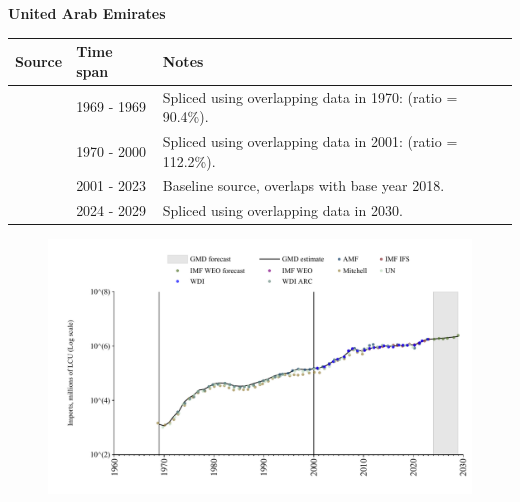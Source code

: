 \documentclass[12pt,a4paper,landscape]{article}
\begin{document}
\begin{adjustbox}{max totalsize={\paperwidth}{\paperheight},center}
\begin{minipage}[t][\textheight][t]{\textwidth}
\vspace*{0.5cm}
{}
\begin{center}
{\Large\bfseries United Arab Emirates}
\end{center}
\vspace{0.5cm}
\begin{table}[H]
\centering
\small
\begin{tabular}{|l|l|l|}
\hline
\textbf{Source} & \textbf{Time span} & \textbf{Notes} \\
\hline
\rowcolor{white}\cite{Mitchell}& 1969 - 1969 &Spliced using overlapping data in 1970: (ratio = 90.4\%).\\
\rowcolor{lightgray}\cite{UN}& 1970 - 2000 &Spliced using overlapping data in 2001: (ratio = 112.2\%).\\
\rowcolor{white}\cite{WDI}& 2001 - 2023 &Baseline source, overlaps with base year 2018.\\
\rowcolor{lightgray}\cite{IMF_WEO_forecast}& 2024 - 2029 &Spliced using overlapping data in 2030.\\
\hline
\end{tabular}
\end{table}
\begin{figure}[H]
\centering
\includegraphics[width=\textwidth,height=0.6\textheight,keepaspectratio]{graphs/ARE_imports.pdf}
\end{figure}
\end{minipage}
\end{adjustbox}
\end{document}
